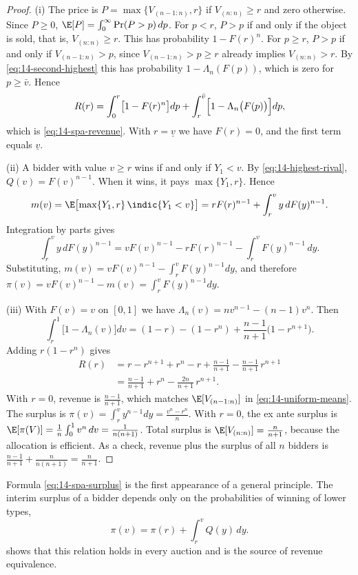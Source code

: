 \begin{proof}
(i) The price is $P=\max\{V_{(n-1:n)},r\}$ if $V_{(n:n)}\ge r$ and zero otherwise. Since $P\ge 0$,
$\E[P]=\int_0^\infty\Pr(P>p)\,dp$. For $p<r$, $P>p$ if and only if the object is sold, that is,
$V_{(n:n)}\ge r$. This has probability $1-F(r)^n$. For $p\ge r$, $P>p$ if and only if $V_{(n-1:n)}>p$, since
$V_{(n-1:n)}>p\ge r$ already implies $V_{(n:n)}>r$. By \eqref{eq:14-second-highest} this has probability
$1-\Lambda_n(F(p))$, which is zero for $p\ge\bar v$. Hence
\[
R(r)=\int_0^{r}\bigl[1-F(r)^n\bigr]dp+\int_r^{\bar v}\Bigl[1-\Lambda_n\bigl(F(p)\bigr)\Bigr]dp,
\]
which is \eqref{eq:14-spa-revenue}. With $r=\underline v$ we have $F(r)=0$, and the first term equals
$\underline v$.

(ii) A bidder with value $v\ge r$ wins if and only if $Y_1<v$. By \eqref{eq:14-highest-rival},
$Q(v)=F(v)^{n-1}$. When it wins, it pays $\max\{Y_1,r\}$. Hence
\[
m(v)=\E\bigl[\max\{Y_1,r\}\,\indic\{Y_1<v\}\bigr]=rF(r)^{n-1}+\int_r^{v}y\,dF(y)^{n-1}.
\]
Integration by parts gives
\[
\int_r^{v}y\,dF(y)^{n-1}=vF(v)^{n-1}-rF(r)^{n-1}-\int_r^{v}F(y)^{n-1}\,dy.
\]
Substituting, $m(v)=vF(v)^{n-1}-\int_r^vF(y)^{n-1}dy$, and therefore
$\pi(v)=vF(v)^{n-1}-m(v)=\int_r^vF(y)^{n-1}dy$.

(iii) With $F(v)=v$ on $[0,1]$ we have $\Lambda_n(v)=nv^{n-1}-(n-1)v^n$. Then
\[
\int_r^1\bigl[1-\Lambda_n(v)\bigr]dv=(1-r)-(1-r^n)+\frac{n-1}{n+1}\bigl(1-r^{n+1}\bigr).
\]
Adding $r(1-r^n)$ gives
\begin{align*}
R(r)&=r-r^{n+1}+r^n-r+\frac{n-1}{n+1}-\frac{n-1}{n+1}\,r^{n+1}\\
&=\frac{n-1}{n+1}+r^n-\frac{2n}{n+1}\,r^{n+1}.
\end{align*}
With $r=0$, revenue is $\frac{n-1}{n+1}$, which matches $\E[V_{(n-1:n)}]$ in \eqref{eq:14-uniform-means}. The
surplus is $\pi(v)=\int_r^vy^{n-1}dy=\frac{v^n-r^n}{n}$. With $r=0$, the ex ante surplus is
$\E[\pi(V)]=\frac{1}{n}\int_0^1v^n\,dv=\frac{1}{n(n+1)}$. Total surplus is $\E[V_{(n:n)}]=\frac{n}{n+1}$,
because the allocation is efficient. As a check, revenue plus the surplus of all $n$ bidders is
$\frac{n-1}{n+1}+\frac{n}{n(n+1)}=\frac{n}{n+1}$.
\end{proof}

Formula \eqref{eq:14-spa-surplus} is the first appearance of a general principle. The interim surplus of a
bidder depends only on the probabilities of winning of lower types,
\[
\pi(v)=\pi(r)+\int_r^{v}Q(y)\,dy.
\]
 shows that this relation holds in every auction and is the source of revenue
equivalence.

